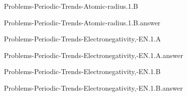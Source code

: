 \documentclass[main.tex]{subfiles}
\newcommand\chapterlabel{}
\begin{document}
\renewcommand\chapterlabel{Ch-radiation}
\begin{question}[ID=\the\value{numA}]
{Problems-Periodic-Trends-Atomic-radius.1.B}
\end{question}
   \begin{Form}
   \TextField[multiline,backgroundcolor=gray!20,borderwidth=0,width=0.43\textwidth  ,height=115pt, name=\the\value{numA}]  { }\end{Form}
\begin{solution}
{Problems-Periodic-Trends-Atomic-radius.1.B.answer}
\hspace{0.1cm}
\end{solution}


\renewcommand\chapterlabel{Ch-radiation}
\begin{question}[ID=\the\value{numA}]
{Problems-Periodic-Trends-Electronegativity,-EN.1.A}
\end{question}
   \begin{Form}
   \TextField[multiline,backgroundcolor=gray!20,borderwidth=0,width=0.43\textwidth  ,height=115pt, name=\the\value{numA}]  { }\end{Form}
\begin{solution}
{Problems-Periodic-Trends-Electronegativity,-EN.1.A.answer}
\hspace{0.1cm}
\end{solution}


\renewcommand\chapterlabel{Ch-radiation}
\begin{question}[ID=\the\value{numA}]
{Problems-Periodic-Trends-Electronegativity,-EN.1.B}
\end{question}
   \begin{Form}
   \TextField[multiline,backgroundcolor=gray!20,borderwidth=0,width=0.43\textwidth  ,height=115pt, name=\the\value{numA}]  { }\end{Form}
\begin{solution}
{Problems-Periodic-Trends-Electronegativity,-EN.1.B.answer}
\hspace{0.1cm}
\end{solution}
\end{document}
